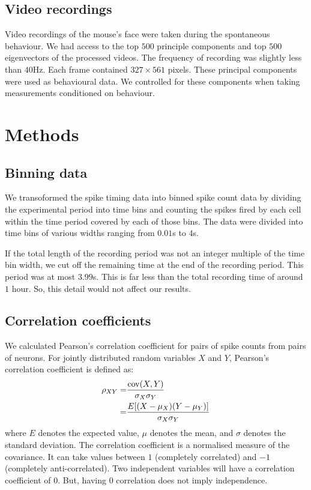     \subsection{Video recordings}\label{sec:video_recordings}
    Video recordings of the mouse's face were taken during the spontaneous behaviour. We had access to the top $500$ principle components and top $500$ eigenvectors of the processed videos. The frequency of recording was slightly less than $40$Hz. Each frame contained $327 \times 561$ pixels. These principal components were used as behavioural data. We controlled for these components when taking measurements conditioned on behaviour.

\section{Methods}
    \subsection{Binning data}
    We transoformed the spike timing data into binned spike count data by dividing the experimental period into time bins and counting the spikes fired by each cell within the time period covered by each of those bins. The data were divided into time bins of various widths ranging from $0.01$s to $4$s.

    If the total length of the recording period was not an integer multiple of the time bin width, we cut off the remaining time at the end of the recording period. This period was at most $3.99$s. This is far less than the total recording time of around $1$ hour. So, this detail would not affect our results.

    \subsection{Correlation coefficients}
    We calculated Pearson's correlation coefficient for pairs of spike counts from pairs of neurons. For jointly distributed random variables $X$ and $Y$, Pearson's correlation coefficient is defined as:
    \begin{align}\label{eq:dist_pearsons_corr}
        \rho_{XY} =& \frac{\text{cov}(X,Y)}{\sigma_X \sigma_Y} \\
                  =& \frac{E[(X - \mu_X)(Y - \mu_Y)]}{\sigma_X \sigma_Y}
    \end{align}
    where $E$ denotes the expected value, $\mu$ denotes the mean, and $\sigma$ denotes the standard deviation. The correlation coefficient is a normalised measure of the covariance. It can take values between $1$ (completely correlated) and $-1$ (completely anti-correlated). Two independent variables will have a correlation coefficient of $0$. But, having $0$ correlation does not imply independence.

